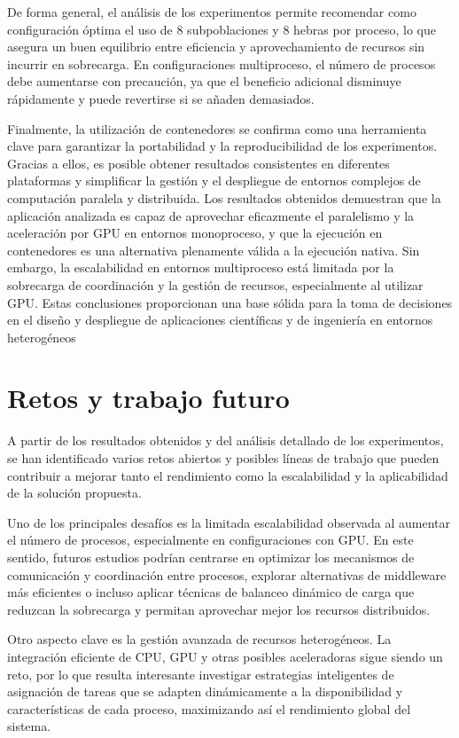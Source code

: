 De forma general, el análisis de los experimentos permite recomendar como configuración óptima el uso de 8 subpoblaciones y 8 hebras por proceso, lo que asegura un buen equilibrio entre eficiencia y aprovechamiento de recursos sin incurrir en sobrecarga. En configuraciones multiproceso, el número de procesos debe aumentarse con precaución, ya que el beneficio adicional disminuye rápidamente y puede revertirse si se añaden demasiados.

Finalmente, la utilización de contenedores se confirma como una herramienta clave para garantizar la portabilidad y la reproducibilidad de los experimentos. Gracias a ellos, es posible obtener resultados consistentes en diferentes plataformas y simplificar la gestión y el despliegue de entornos complejos de computación paralela y distribuida. Los resultados obtenidos demuestran que la aplicación analizada es capaz de aprovechar eficazmente el paralelismo y la aceleración por GPU en entornos monoproceso, y que la ejecución en contenedores es una alternativa plenamente válida a la ejecución nativa. Sin embargo, la escalabilidad en entornos multiproceso está limitada por la sobrecarga de coordinación y la gestión de recursos, especialmente al utilizar GPU. Estas conclusiones proporcionan una base sólida para la toma de decisiones en el diseño y despliegue de aplicaciones científicas y de ingeniería en entornos heterogéneos

\section{Retos y trabajo futuro}

A partir de los resultados obtenidos y del análisis detallado de los experimentos, se han identificado varios retos abiertos y posibles líneas de trabajo que pueden contribuir a mejorar tanto el rendimiento como la escalabilidad y la aplicabilidad de la solución propuesta.

Uno de los principales desafíos es la limitada escalabilidad observada al aumentar el número de procesos, especialmente en configuraciones con GPU. En este sentido, futuros estudios podrían centrarse en optimizar los mecanismos de comunicación y coordinación entre procesos, explorar alternativas de middleware más eficientes o incluso aplicar técnicas de balanceo dinámico de carga que reduzcan la sobrecarga y permitan aprovechar mejor los recursos distribuidos.

Otro aspecto clave es la gestión avanzada de recursos heterogéneos. La integración eficiente de CPU, GPU y otras posibles aceleradoras sigue siendo un reto, por lo que resulta interesante investigar estrategias inteligentes de asignación de tareas que se adapten dinámicamente a la disponibilidad y características de cada proceso, maximizando así el rendimiento global del sistema.

